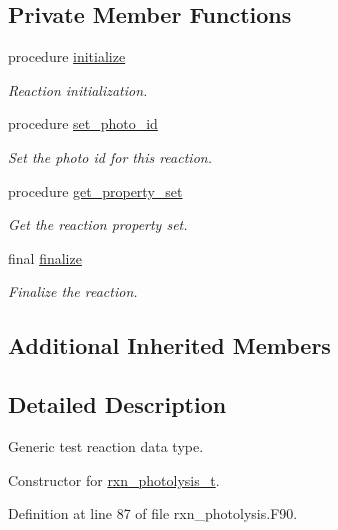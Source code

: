 \subsection*{Private Member Functions}
\begin{DoxyCompactItemize}
\item 
procedure \mbox{\hyperlink{structpmc__rxn__photolysis_1_1rxn__photolysis__t_a7d6fb6521391e975f8d1ddac551cf1a6}{initialize}}
\begin{DoxyCompactList}\small\item\em Reaction initialization. \end{DoxyCompactList}\item 
procedure \mbox{\hyperlink{structpmc__rxn__photolysis_1_1rxn__photolysis__t_a6d092343f1c5d7ba2c48fdf76099aa67}{set\+\_\+photo\+\_\+id}}
\begin{DoxyCompactList}\small\item\em Set the photo id for this reaction. \end{DoxyCompactList}\item 
procedure \mbox{\hyperlink{structpmc__rxn__photolysis_1_1rxn__photolysis__t_a4af30a86fec5ca621eae12b191214630}{get\+\_\+property\+\_\+set}}
\begin{DoxyCompactList}\small\item\em Get the reaction property set. \end{DoxyCompactList}\item 
final \mbox{\hyperlink{structpmc__rxn__photolysis_1_1rxn__photolysis__t_ab6e7f0da0d290ad25e02822f266ab7e1}{finalize}}
\begin{DoxyCompactList}\small\item\em Finalize the reaction. \end{DoxyCompactList}\end{DoxyCompactItemize}
\subsection*{Additional Inherited Members}


\subsection{Detailed Description}
Generic test reaction data type. 

Constructor for \mbox{\hyperlink{structpmc__rxn__photolysis_1_1rxn__photolysis__t}{rxn\+\_\+photolysis\+\_\+t}}. 

Definition at line 87 of file rxn\+\_\+photolysis.\+F90.



